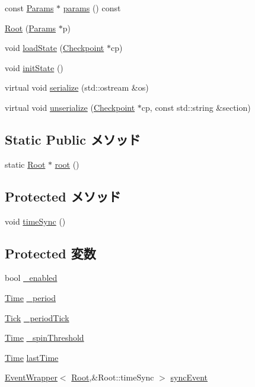 \begin{DoxyCompactItemize}
const \hyperlink{classRoot_a0e87bb7e60cbe3229b1cb552ebb686e0}{Params} $\ast$ \hyperlink{classRoot_acd3c3feb78ae7a8f88fe0f110a718dff}{params} () const 
\item 
\hyperlink{classRoot_abc86df64e340cf2d26b91bb2006f6823}{Root} (\hyperlink{classRoot_a0e87bb7e60cbe3229b1cb552ebb686e0}{Params} $\ast$p)
\item 
void \hyperlink{classRoot_a0c3e6eb311ceff72035b11f2a5e0f186}{loadState} (\hyperlink{classCheckpoint}{Checkpoint} $\ast$cp)
\item 
void \hyperlink{classRoot_a3c34ea9b29f410748d4435a667484924}{initState} ()
\item 
virtual void \hyperlink{classRoot_a53e036786d17361be4c7320d39c99b84}{serialize} (std::ostream \&os)
\item 
virtual void \hyperlink{classRoot_af22e5d6d660b97db37003ac61ac4ee49}{unserialize} (\hyperlink{classCheckpoint}{Checkpoint} $\ast$cp, const std::string \&section)
\end{DoxyCompactItemize}
\subsection*{Static Public メソッド}
\begin{DoxyCompactItemize}
\item 
static \hyperlink{classRoot_1_1Root}{Root} $\ast$ \hyperlink{classRoot_ac0ea009f164c8391bd2371c57518a5b2}{root} ()
\end{DoxyCompactItemize}
\subsection*{Protected メソッド}
\begin{DoxyCompactItemize}
\item 
void \hyperlink{classRoot_a9a1e892e8081bcf0f3d918f378d78e52}{timeSync} ()
\end{DoxyCompactItemize}
\subsection*{Protected 変数}
\begin{DoxyCompactItemize}
\item 
bool \hyperlink{classRoot_a096e979db21287ad2b56b0ad270ac681}{\_\-enabled}
\item 
\hyperlink{classTime}{Time} \hyperlink{classRoot_a858c13841be35f29f395107eba533cb8}{\_\-period}
\item 
\hyperlink{base_2types_8hh_a5c8ed81b7d238c9083e1037ba6d61643}{Tick} \hyperlink{classRoot_a73b10c2d1eeecc817ef8cb4814c514fb}{\_\-periodTick}
\item 
\hyperlink{classTime}{Time} \hyperlink{classRoot_a95af4ca66c183d211cbe51f28f876625}{\_\-spinThreshold}
\item 
\hyperlink{classTime}{Time} \hyperlink{classRoot_af285d39478c6a28a617a471a6232fd4c}{lastTime}
\item 
\hyperlink{classEventWrapper}{EventWrapper}$<$ \hyperlink{classRoot_1_1Root}{Root},\&Root::timeSync $>$ \hyperlink{classRoot_ac83acdff678c3ae9e22c78d639866177}{syncEvent}
\end{DoxyCompactItemize}
